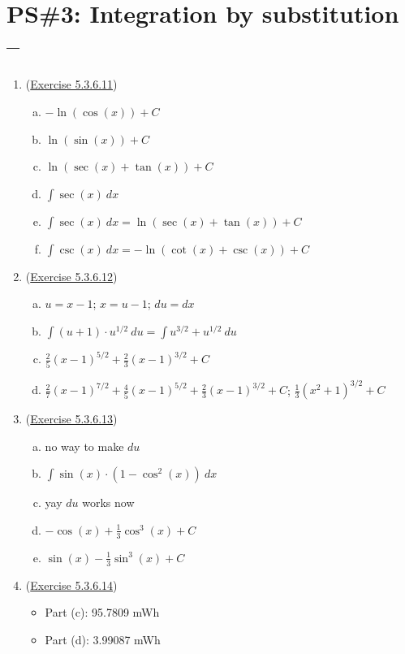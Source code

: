 


%


\allowdisplaybreaks
\section{PS\#3:  Integration by substitution --  }

\everymath{\displaystyle}
\begin{enumerate}[leftmargin=0pt]
    \item (\href{https://activecalculus.org/single/sec-5-3-substitution.html#ez-5-3-11}{Exercise 5.3.6.11})
    \begin{enumerate}[(a)]
        \item $-\ln(\cos(x))+C$
        \item $\ln(\sin(x))+C$
        \item $\ln(\sec(x)+\tan(x))+C$
        \item $\int\sec(x)\ dx$
        \item $\int\sec(x)\ dx = \ln(\sec(x)+\tan(x))+C$
        \item $\int\csc(x)\ dx = -\ln(\cot(x)+\csc(x))+C$
    \end{enumerate}

    \item (\href{https://activecalculus.org/single/sec-5-3-substitution.html#ez-5-3-12}{Exercise 5.3.6.12})
    \begin{enumerate}[(a)]
        \item $u = x-1$; $x = u-1$; $du = dx$
        \item $\int (u+1)\cdot u^{1/2}\ du = \int u^{3/2} + u^{1/2}\ du$
        \item $\frac{2}{5}(x-1)^{5/2} + \frac23(x-1)^{3/2} + C$
        \item $\frac27 (x-1)^{7/2}+\frac45(x-1)^{5/2}+\frac23(x-1)^{3/2} +C$; \quad $\frac13(x^2+1)^{3/2}+C$
    \end{enumerate}

    \item  (\href{https://activecalculus.org/single/sec-5-3-substitution.html#ez-5-3-13}{Exercise 5.3.6.13})
    \begin{enumerate}[(a)]
        \item no way to make $du$
        \item $\int \sin(x)\cdot(1-\cos^2(x))\ dx$
        \item yay $du$ works now
        \item $-\cos(x) + \frac13 \cos^3(x) + C$
        \item $\sin(x) - \frac13 \sin^3(x) + C$
    \end{enumerate}

    \item (\href{https://activecalculus.org/single/sec-5-3-substitution.html#ez-5-3-14}{Exercise 5.3.6.14})
    \begin{itemize}
        \item Part (c): 95.7809 mWh
        \item Part (d): 3.99087 mWh
    \end{itemize}
\end{enumerate}
